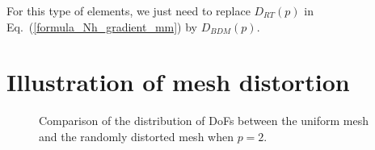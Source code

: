 \documentclass[review,3p]{elsarticle}
\begin{document}
For this type of elements, we just need to replace $D_{RT}(p)$ in Eq.~(\ref{formula_Nh_gradient_mm}) by $D_{BDM}(p)$.

\section{Illustration of mesh distortion}

\begin{figure}[!ht]
\centering
   \caption{Comparison of the distribution of DoFs between the uniform mesh and the randomly distorted mesh when $p=2$.}
   \label{measuring_distortion_randomly}
\end{figure}

\newpage
\end{document}
